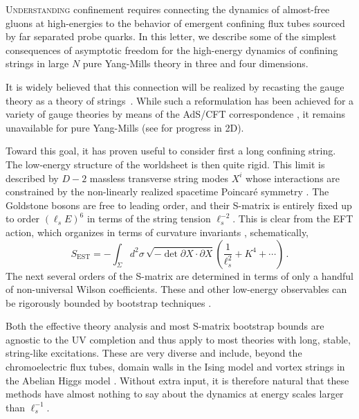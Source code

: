 \documentclass[
 reprint,
 amsmath,
 pre,
 amssymb,
 nofootinbib,
 aps,
 longbibliography,
]{revtex4-1}
\newcommand{\<}{{\langle}}
\renewcommand{\>}{{\rangle}}
\begin{document}
  \lettrine{U}{nderstanding} confinement requires connecting the dynamics of almost-free gluons at high-energies to the behavior of emergent confining flux tubes sourced by far separated probe quarks. In this letter, we describe some of the simplest consequences of asymptotic freedom \cite{Gross:1973id,Politzer:1973fx} for the high-energy dynamics of confining strings in large $N$ pure Yang-Mills theory in three and four dimensions.

    It is widely believed that this connection will be realized by recasting the gauge theory as a theory of strings~\cite{tHooft:1973alw, Nambu:1974zg,Polyakov:1987hqn}. While such a reformulation has been achieved for a variety of gauge theories by means of the AdS/CFT correspondence \cite{Maldacena:1997re,Gubser:1998bc,Witten:1998qj}, it remains unavailable for pure Yang-Mills (see \cite{Gross:1993hu,Aharony:2023tam,Komatsu:2025sqo,Aharony:2025owv,Komatsu:2025dqv} for progress in 2D).

    Toward this goal, it has proven useful to consider first a long confining string.
    The low-energy structure of the worldsheet is then quite rigid.
 This limit is described by $D-2$ massless transverse string modes $X^i$ whose interactions are constrained by the non-linearly realized spacetime Poincaré symmetry \cite{Nambu:1974zg,Luscher:1980ac,Polchinski:1991ax,Dubovsky:2012sh,Aharony:2013ipa}.
 The Goldstone bosons are free to leading order, and their S-matrix is entirely fixed up to order $(\ell_s E)^6$ in terms of the string tension $\ell_s^{-2}$. This is clear from the EFT action, which organizes in terms of curvature invariants \cite{Isham:1971dv,Volkov:1973vd, Polyakov:1986cs, Kleinert:1986bk}, schematically,
 \begin{equation}\label{eq:SEST}
    S_{\text{EST}} = -\int_{\Sigma} d^2\sigma \, \sqrt{-\det \partial X\cdot \partial X} \left(\frac{1}{\ell_s^2} +   K^4+\cdots\right)\,.
\end{equation}
 The next several orders of the S-matrix are determined in terms of only a handful of non-universal Wilson coefficients. These and other low-energy observables can be rigorously bounded by bootstrap techniques \cite{Paulos:2016but,EliasMiro:2019kyf,EliasMiro:2021nul,Gaikwad:2023hof,Guerrieri:2024ckc}.

 Both the effective theory analysis and most S-matrix bootstrap bounds are agnostic to the UV completion and thus apply to most theories with long, stable, string-like excitations.
These are very diverse and include, beyond the chromoelectric flux tubes, domain walls in the Ising model \cite{Caselle:2002ah, Baffigo:2023rin, Lima:2025sqa}
and vortex strings in the Abelian Higgs model \cite{Abrikosov:1956sx, Nielsen:1973cs}. Without extra input, it is therefore natural that these methods have almost nothing to say about the dynamics at energy scales larger than $\ell_s^{-1}$.
\end{document}

